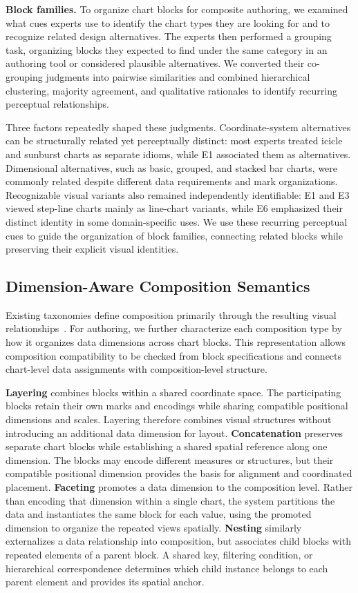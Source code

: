 \textbf{Block families.}
To organize chart blocks for composite authoring, we examined what cues experts
use to identify the chart types they are looking for and to recognize related
design alternatives. The experts then performed a grouping task, organizing
blocks they expected to find under the same category in an authoring tool or
considered plausible alternatives. We converted their co-grouping judgments
into pairwise similarities and combined hierarchical clustering, majority
agreement, and qualitative rationales to identify recurring perceptual
relationships.

Three factors repeatedly shaped these judgments. Coordinate-system alternatives
can be structurally related yet perceptually distinct: most experts treated
icicle and sunburst charts as separate idioms, while E1 associated them as
alternatives. Dimensional alternatives, such as basic,
grouped, and stacked bar charts, were commonly related despite different data
requirements and mark organizations. Recognizable visual variants also
remained independently identifiable: E1 and E3 viewed step-line charts mainly
as line-chart variants, while E6 emphasized their distinct identity in some
domain-specific uses. We use these recurring perceptual cues to guide the
organization of block families, connecting related blocks while preserving
their explicit visual identities.



\subsection{Dimension-Aware Composition Semantics}

Existing taxonomies define composition primarily through the resulting visual
relationships~\cite{javed2012exploring,Composite,vaid}. For authoring, we
further characterize each composition type by how it organizes data dimensions
across chart blocks. This representation allows composition compatibility to
be checked from block specifications and connects chart-level data assignments
with composition-level structure.

\textbf{Layering} combines blocks within a shared coordinate space. The
participating blocks retain their own marks and encodings while sharing
compatible positional dimensions and scales. Layering therefore combines
visual structures without introducing an additional data dimension for layout.
\textbf{Concatenation} preserves separate chart blocks while establishing a
shared spatial reference along one dimension. The blocks may encode different
measures or structures, but their compatible positional dimension provides the
basis for alignment and coordinated placement.
\textbf{Faceting} promotes a data dimension to the composition level. Rather
than encoding that dimension within a single chart, the system partitions the
data and instantiates the same block for each value, using the promoted
dimension to organize the repeated views spatially.
\textbf{Nesting} similarly externalizes a data relationship into composition,
but associates child blocks with repeated elements of a parent block. A shared
key, filtering condition, or hierarchical correspondence determines which
child instance belongs to each parent element and provides its spatial anchor.

